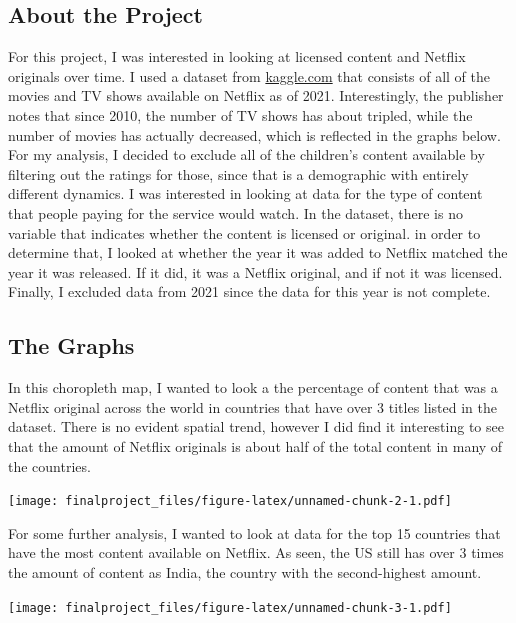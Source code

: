 \documentclass[
]{article}
\begin{document}
\hypertarget{about-the-project}{%
\subsection{About the Project}\label{about-the-project}}

For this project, I was interested in looking at licensed content and
Netflix originals over time. I used a dataset from
\href{https://www.kaggle.com/shivamb/netflix-shows}{kaggle.com} that
consists of all of the movies and TV shows available on Netflix as of
2021. Interestingly, the publisher notes that since 2010, the number of
TV shows has about tripled, while the number of movies has actually
decreased, which is reflected in the graphs below. For my analysis, I
decided to exclude all of the children's content available by filtering
out the ratings for those, since that is a demographic with entirely
different dynamics. I was interested in looking at data for the type of
content that people paying for the service would watch. In the dataset,
there is no variable that indicates whether the content is licensed or
original. in order to determine that, I looked at whether the year it
was added to Netflix matched the year it was released. If it did, it was
a Netflix original, and if not it was licensed. Finally, I excluded data
from 2021 since the data for this year is not complete.

\hypertarget{the-graphs}{%
\subsection{The Graphs}\label{the-graphs}}

In this choropleth map, I wanted to look a the percentage of content
that was a Netflix original across the world in countries that have over
3 titles listed in the dataset. There is no evident spatial trend,
however I did find it interesting to see that the amount of Netflix
originals is about half of the total content in many of the countries.

\texttt{[image: finalproject\_files/figure-latex/unnamed-chunk-2-1.pdf]}

For some further analysis, I wanted to look at data for the top 15
countries that have the most content available on Netflix. As seen, the
US still has over 3 times the amount of content as India, the country
with the second-highest amount.

\texttt{[image: finalproject\_files/figure-latex/unnamed-chunk-3-1.pdf]}
\end{document}
